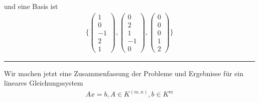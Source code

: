 \documentclass[11pt]{report}
\begin{document}
und eine Basis ist
\begin{align}
\{\begin{pmatrix} 1 \\ 0 \\ -1 \\ 2 \\ 1 \end{pmatrix},\begin{pmatrix} 0 \\ 2 \\ 1 \\ -1 \\ 0\end{pmatrix},\begin{pmatrix} 0 \\ 0 \\ 0 \\ 1 \\ 2\end{pmatrix}\}
\end{align}
\vspace*{0.2cm}\rule{\linewidth}{0.3mm}\vspace{0.2cm}
Wir machen jetzt eine Zusammenfassung der Probleme und Ergebnisse für ein lineares Gleichungssystem
\begin{align}
Ax = b, A \in K^{(m,n)}, b \in K^m
\end{align}
\end{document}
